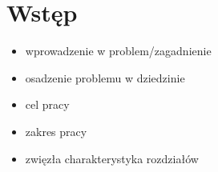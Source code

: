 \chapter{Wstęp}

\begin{itemize}
\item wprowadzenie w problem/zagadnienie 
\item osadzenie problemu w dziedzinie 
\item cel pracy 
\item zakres pracy 
\item zwięzła charakterystyka rozdziałów 
\end{itemize}


